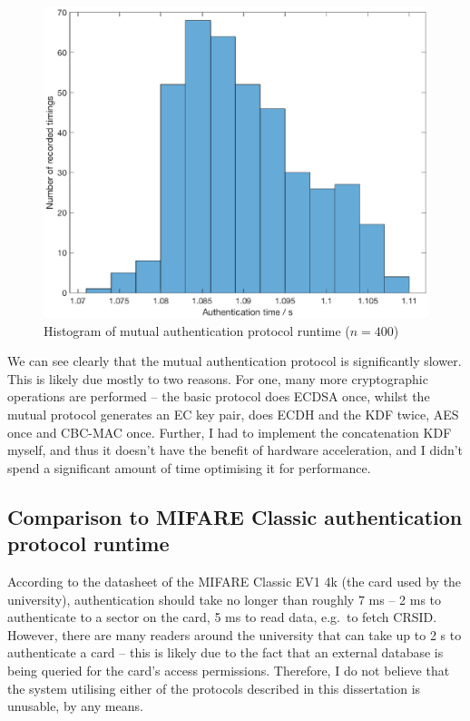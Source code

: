 \documentclass[12pt,a4paper,twoside,openright]{report}
\begin{document}
\begin{figure}[tbh]
\centerline{\includegraphics[scale=0.8]{figures/mutualauthplot.eps}}
\caption{Histogram of mutual authentication protocol runtime ($n = 400$)}
\label{mutualauthplot}
\end{figure}

\noindent
We can see clearly that the mutual authentication protocol is significantly slower. This is likely due mostly to two reasons. For one, many more cryptographic operations are performed -- the basic protocol does ECDSA once, whilst the mutual protocol generates an EC key pair, does ECDH and the KDF twice, AES once and CBC-MAC once. Further, I had to implement the concatenation KDF myself, and thus it doesn't have the benefit of hardware acceleration, and I didn't spend a significant amount of time optimising it for performance.

\subsection{Comparison to MIFARE Classic authentication protocol runtime}

According to the datasheet of the MIFARE Classic EV1 4k (the card used by the university), authentication should take no longer than roughly 7 ms -- 2 ms to authenticate to a sector on the card, 5 ms to read data, e.g.\ to fetch CRSID. However, there are many readers around the university that can take up to 2 s to authenticate a card -- this is likely due to the fact that an external database is being queried for the card's access permissions. Therefore, I do not believe that the system utilising either of the protocols described in this dissertation is unusable, by any means.
\end{document}
